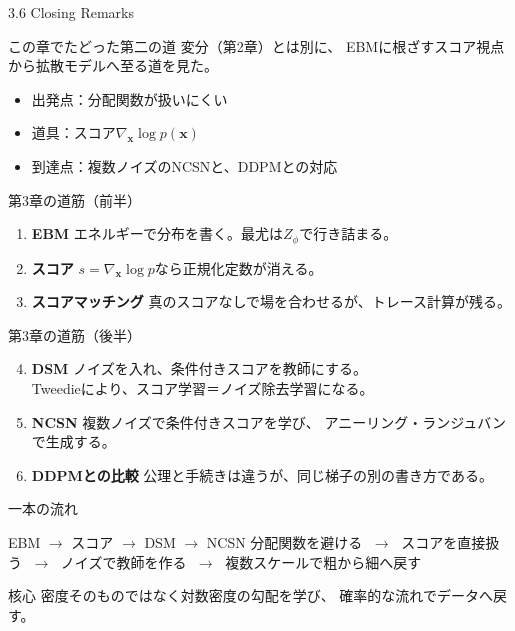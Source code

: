 ﻿%


\begin{frame}{3.6 Closing Remarks}
    \begin{block}{この章でたどった第二の道}
        変分（第2章）とは別に、
        EBMに根ざすスコア視点から拡散モデルへ至る道を見た。
    \end{block}
    \begin{itemize}
        \item 出発点：分配関数が扱いにくい
        \item 道具：スコア$\nabla_{\bm{x}}\log p(\bm{x})$
        \item 到達点：複数ノイズのNCSNと、DDPMとの対応
    \end{itemize}
\end{frame}
\asmain
\begin{frame}{第3章の道筋（前半）}
    \begin{enumerate}
        \item \textbf{EBM}
        エネルギーで分布を書く。最尤は$Z_\phi$で行き詰まる。
        \item \textbf{スコア}
        $s=\nabla_{\bm{x}}\log p$なら正規化定数が消える。
        \item \textbf{スコアマッチング}
        真のスコアなしで場を合わせるが、トレース計算が残る。
    \end{enumerate}
\end{frame}
\asmain
\begin{frame}{第3章の道筋（後半）}
    \begin{enumerate}
        \setcounter{enumi}{3}
        \item \textbf{DSM}
        ノイズを入れ、条件付きスコアを教師にする。\\
        Tweedieにより、スコア学習＝ノイズ除去学習になる。
        \item \textbf{NCSN}
        複数ノイズで条件付きスコアを学び、
        アニーリング・ランジュバンで生成する。
        \item \textbf{DDPMとの比較}
        公理と手続きは違うが、同じ梯子の別の書き方である。
    \end{enumerate}
\end{frame}
\asmain
\begin{frame}{一本の流れ}
    \begin{block}{EBM $\to$ スコア $\to$ DSM $\to$ NCSN}
        分配関数を避ける
        $\;\to\;$
        スコアを直接扱う
        $\;\to\;$
        ノイズで教師を作る
        $\;\to\;$
        複数スケールで粗から細へ戻す
    \end{block}
    \begin{block}{核心}
        密度そのものではなく対数密度の勾配を学び、
        確率的な流れでデータへ戻す。
    \end{block}
\end{frame}
